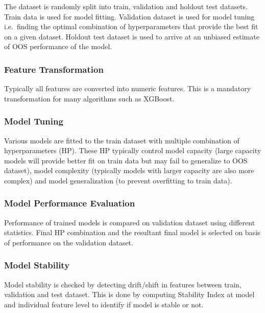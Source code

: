 \documentclass[
  letterpaper,
  DIV=11,
  numbers=noendperiod]{scrartcl}
\begin{document}
The dataset is randomly split into train, validation and holdout test
datasets. Train data is used for model fitting. Validation dataset is
used for model tuning i.e.~finding the optimal combination of
hyperparameters that provide the best fit on a given dataset. Holdout
test dataset is used to arrive at an unbiased estimate of OOS
performance of the model.

\hypertarget{feature-transformation}{%
\subsubsection{Feature Transformation}\label{feature-transformation}}

Typically all features are converted into numeric features. This is a
mandatory transformation for many algorithms such as XGBoost.

\hypertarget{model-tuning}{%
\subsubsection{Model Tuning}\label{model-tuning}}

Various models are fitted to the train dataset with multiple combination
of hyperparameters (HP). These HP typically control model capacity
(large capacity models will provide better fit on train data but may
fail to generalize to OOS dataset), model complexity (typically models
with larger capacity are also more complex) and model generalization (to
prevent overfitting to train data).

\hypertarget{model-performance-evaluation}{%
\subsubsection{Model Performance
Evaluation}\label{model-performance-evaluation}}

Performance of trained models is compared on validation dataset using
different statistics. Final HP combination and the resultant final model
is selected on basis of performance on the validation dataset.

\hypertarget{model-stability}{%
\subsubsection{Model Stability}\label{model-stability}}

Model stability is checked by detecting drift/shift in features between
train, validation and test dataset. This is done by computing Stability
Index at model and individual feature level to identify if model is
stable or not.
\end{document}
